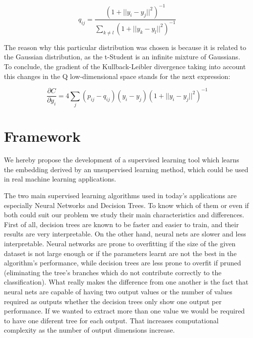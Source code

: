 \documentclass[a4paper,11pt,spanish]{report}
\begin{document}
$$ q_{ij} = \frac{(1+ ||y_{i}-y_{j}||^2)^{-1}} {\sum\limits_{k\neq l} (1+ ||y_{k}-y_{l}||^2)^{-1} }$$

The reason why this particular distribution was chosen is because it is related to the Gaussian distribution, as the t-Student is an infinite mixture of Gaussians.\\
To conclude, the gradient of the Kullback-Leibler divergence taking into account this changes in the Q low-dimensional space stands for the next expression:

$$ \frac{\partial C}{\partial y_{i}} = 4 \sum\limits_j (p_{ij} - q_{ij}) (y_{i} - y_{j}) (1+ ||y_{i}-y_{j}||^2)^{-1}$$



\chapter{Framework}
\label{chap:frame}

We hereby propose the development of a supervised learning tool which learns the embedding derived by an unsupervised learning method, which could be used in real machine learning applications.

The two main supervised learning algorithms used in today's applications are especially Neural Networks and Decision Trees. To know which of them or even if both could suit our problem we study their main characteristics and differences.\\
First of all, decision trees are known to be faster and easier to train, and their results are very interpretable. On the other hand, neural nets are slower and less interpretable. Neural networks are prone to overfitting if the size of the given dataset is not large enough or if the parameters learnt are not the best in the algorithm's performance, while decision trees are less prone to overfit if pruned (eliminating the tree's branches which do not contribute  correctly to the classification). What really makes the difference from one another is the fact that neural nets are capable of having two output values or the number of values required as outputs whether the decision trees only show one output per performance. If we wanted to extract more than one value we would be required to have one diferent tree for each output. That increases computational complexity as the number of output dimensions increase.
\end{document}
